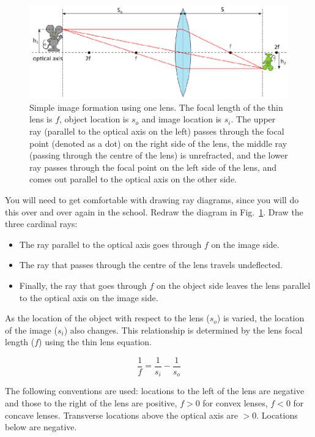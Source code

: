 \documentclass[a4paper]{report}
\begin{document}
\begin{figure}[h]
\center
\includegraphics{image_forming_basics.eps}
\caption{Simple image formation using one lens. 
The focal length of the thin lens is $f$, object location is $s_o$ and image location is $s_i$. 
The upper ray (parallel to the optical axis on the left) passes through the focal point (denoted as a dot) on the right side of the lens, the middle ray (passing through the centre of the lens) is unrefracted, and the lower ray passes through the focal point on the left side of the lens, and comes out parallel to the optical axis on the other side. 
}
\label{fig:imageforming}
\end{figure}

You will need to get comfortable with drawing ray diagrams, since you will do this over and over again in the school.
Redraw the diagram in Fig.~\ref{fig:imageforming}.
Draw the three cardinal rays:
\begin{itemize}
\item The ray parallel to the optical axis goes through $f$ on the image side.
\item The ray that passes through the centre of the lens travels undeflected.
\item Finally, the ray that goes through $f$ on the object side leaves the lens parallel to the optical axis on the image side. 
\end{itemize}

As the location of the object with respect to the lens ($s_o$) is varied, the location of the image ($s_i$) also changes. This relationship is determined by the lens focal length ($f$) using the thin lens equation.

\begin{equation}
\frac{1}{f} = \frac{1}{s_i} - \frac{1}{s_o}
\label{eq:thinlens}
\end{equation}

The following conventions are used: locations to the left of the lens are negative and those to the right of the lens are positive, $f>0$ for convex lenses, $f<0$ for concave lenses.
Transverse locations above the optical axis are $>0$. Locations below are negative. 
\end{document}
